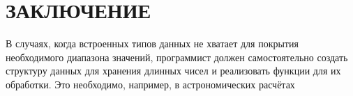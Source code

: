 \section*{ЗАКЛЮЧЕНИЕ}
В случаях, когда встроенных типов данных не хватает для покрытия необходимого диапазона значений, программист должен самостоятельно создать структуру данных для хранения длинных чисел и реализовать функции для их обработки. Это необходимо, например, в астрономических расчётах 